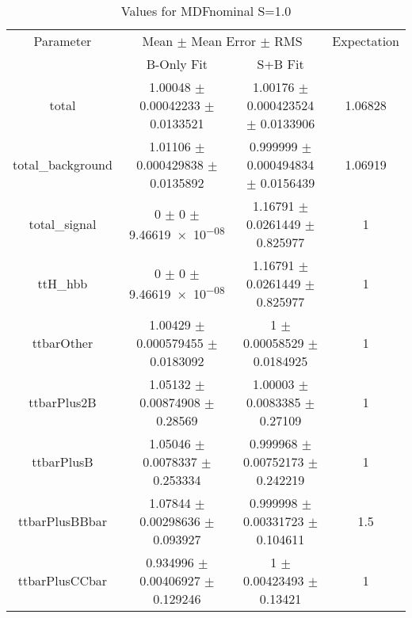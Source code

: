 \begin{table}
\centering
\caption{Values for MDFnominal S=1.0}
\begin{tabular}{cccc}
\toprule
Parameter & \multicolumn{2}{c}{Mean $\pm$ Mean Error $\pm$ RMS} & Expectation\\
 & B-Only Fit & S+B Fit & \\
\midrule
total & \num{1.00048} $\pm$ \num{0.00042233} $\pm$ \num{0.0133521} & \num{1.00176} $\pm$ \num{0.000423524} $\pm$ \num{0.0133906} & \num{1.06828}\\
total\_background & \num{1.01106} $\pm$ \num{0.000429838} $\pm$ \num{0.0135892} & \num{0.999999} $\pm$ \num{0.000494834} $\pm$ \num{0.0156439} & \num{1.06919}\\
total\_signal & \num{0} $\pm$ \num{0} $\pm$ \num{9.46619e-08} & \num{1.16791} $\pm$ \num{0.0261449} $\pm$ \num{0.825977} & \num{1}\\
ttH\_hbb & \num{0} $\pm$ \num{0} $\pm$ \num{9.46619e-08} & \num{1.16791} $\pm$ \num{0.0261449} $\pm$ \num{0.825977} & \num{1}\\
ttbarOther & \num{1.00429} $\pm$ \num{0.000579455} $\pm$ \num{0.0183092} & \num{1} $\pm$ \num{0.00058529} $\pm$ \num{0.0184925} & \num{1}\\
ttbarPlus2B & \num{1.05132} $\pm$ \num{0.00874908} $\pm$ \num{0.28569} & \num{1.00003} $\pm$ \num{0.0083385} $\pm$ \num{0.27109} & \num{1}\\
ttbarPlusB & \num{1.05046} $\pm$ \num{0.0078337} $\pm$ \num{0.253334} & \num{0.999968} $\pm$ \num{0.00752173} $\pm$ \num{0.242219} & \num{1}\\
ttbarPlusBBbar & \num{1.07844} $\pm$ \num{0.00298636} $\pm$ \num{0.093927} & \num{0.999998} $\pm$ \num{0.00331723} $\pm$ \num{0.104611} & \num{1.5}\\
ttbarPlusCCbar & \num{0.934996} $\pm$ \num{0.00406927} $\pm$ \num{0.129246} & \num{1} $\pm$ \num{0.00423493} $\pm$ \num{0.13421} & \num{1}\\
\bottomrule
\end{tabular}
\end{table}